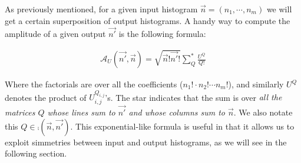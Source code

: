 As previously mentioned, for a given input histogram $\vec{n} = (n_1, \cdots, n_{m})$ we will get a certain superposition of output histograms. A handy way to compute the amplitude of a given output $\vec{n'}$ is the following formula:

\begin{align}
 \mathcal{A}_{U}(\vec{n'},\vec{n}) = \sqrt{\vec{n}! \vec{n'}!} \sum_{Q}^{*} \frac{U^{Q}}{Q!}\label{exp}
\end{align}

Where the factorials are over all the coefficients ($n_{1}! \cdot n_{2}! \cdots n_{m}!$), and similarly $U^{Q}$ denotes the product of $U_{i,j}^{Q_{i,j}}$'s. The star indicates that the sum is over \emph{all the matrices $Q$ whose lines sum to $\vec{n'}$ and whose columns sum to $\vec{n}$}. We also notate this $Q \in \comp(\vec{n}, \vec{n'})$. This exponential-like formula is useful in that it allows us to exploit simmetries between input and output histograms, as we will see in the following section.
